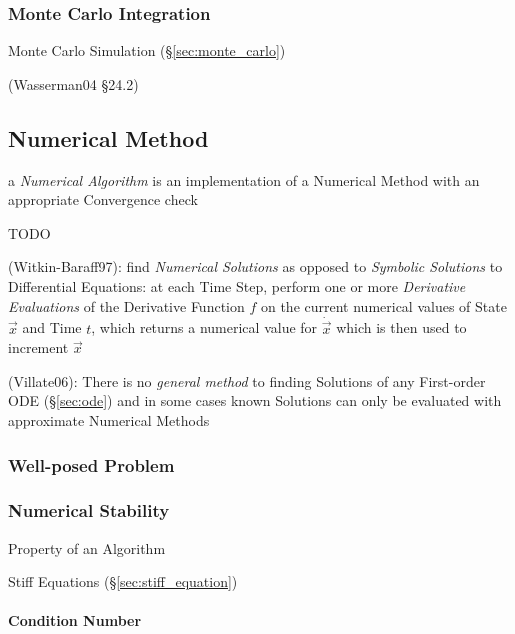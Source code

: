 {\subsubsection{Monte Carlo Integration}\label{sec:monte_carlo_integration}

Monte Carlo Simulation (\S\ref{sec:monte_carlo})

(Wasserman04 \S24.2)



\subsection{Numerical Method}\label{sec:numerical_method}

a \emph{Numerical Algorithm} is an implementation of a Numerical Method with an
appropriate Convergence check

TODO

(Witkin-Baraff97): find \emph{Numerical Solutions} as opposed to \emph{Symbolic
  Solutions} to Differential Equations: at each Time Step, perform one or more
\emph{Derivative Evaluations} of the Derivative Function $f$ on the current
numerical values of State $\vec{x}$ and Time $t$, which returns a numerical
value for $\dot{\vec{x}}$ which is then used to increment $\vec{x}$

(Villate06): There is no \emph{general method} to finding Solutions of any
First-order ODE (\S\ref{sec:ode}) and in some cases known Solutions can only be
evaluated with approximate Numerical Methods



\subsubsection{Well-posed Problem}\label{sec:well_posed}

\subsubsection{Numerical Stability}\label{sec:numerical_stability}

Property of an Algorithm

Stiff Equations (\S\ref{sec:stiff_equation})



\paragraph{Condition Number}\label{sec:condition_number}\hfill

}
